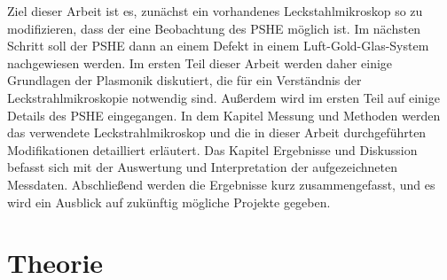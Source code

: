 \documentclass[titlepage]{article}
\begin{document}
Ziel dieser Arbeit ist es, zunächst ein vorhandenes Leckstahlmikroskop so zu modifizieren, dass der eine Beobachtung des PSHE möglich ist. Im nächsten Schritt soll der PSHE dann an einem Defekt in einem Luft-Gold-Glas-System nachgewiesen werden. Im ersten Teil dieser Arbeit werden daher einige Grundlagen der Plasmonik diskutiert, die für ein Verständnis der Leckstrahlmikroskopie notwendig sind. Außerdem wird im ersten Teil auf einige Details des PSHE eingegangen. In dem Kapitel Messung und Methoden werden das verwendete Leckstrahlmikroskop und die in dieser Arbeit durchgeführten Modifikationen detailliert erläutert. Das Kapitel Ergebnisse und Diskussion befasst sich mit der Auswertung und Interpretation der aufgezeichneten Messdaten. Abschließend werden die Ergebnisse kurz zusammengefasst, und es wird ein Ausblick auf zukünftig mögliche Projekte gegeben.  

\section{Theorie}
\end{document}
